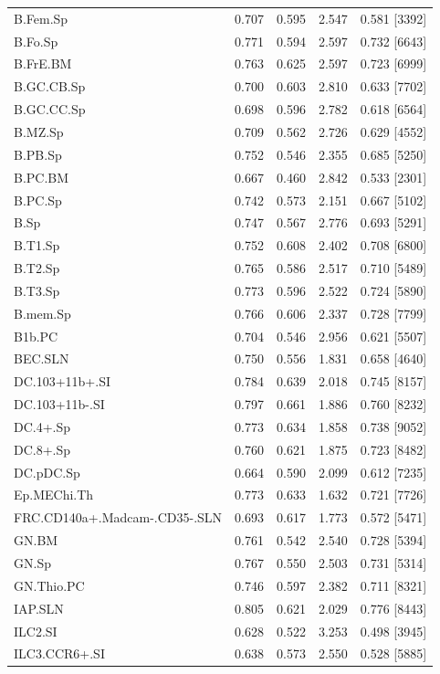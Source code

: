 \begin{longtable}[c]{lrrrr}
B.Fem.Sp & 0.707 & 0.595 & 2.547 & 0.581 [3392]  \\
B.Fo.Sp & 0.771 & 0.594 & 2.597 & 0.732 [6643]  \\
B.FrE.BM & 0.763 & 0.625 & 2.597 & 0.723 [6999]  \\
B.GC.CB.Sp & 0.700 & 0.603 & 2.810 & 0.633 [7702]  \\
B.GC.CC.Sp & 0.698 & 0.596 & 2.782 & 0.618 [6564]  \\
B.MZ.Sp & 0.709 & 0.562 & 2.726 & 0.629 [4552]  \\
B.PB.Sp & 0.752 & 0.546 & 2.355 & 0.685 [5250]  \\
B.PC.BM & 0.667 & 0.460 & 2.842 & 0.533 [2301]  \\
B.PC.Sp & 0.742 & 0.573 & 2.151 & 0.667 [5102]  \\
B.Sp & 0.747 & 0.567 & 2.776 & 0.693 [5291]  \\
B.T1.Sp & 0.752 & 0.608 & 2.402 & 0.708 [6800]  \\
B.T2.Sp & 0.765 & 0.586 & 2.517 & 0.710 [5489]  \\
B.T3.Sp & 0.773 & 0.596 & 2.522 & 0.724 [5890]  \\
B.mem.Sp & 0.766 & 0.606 & 2.337 & 0.728 [7799]  \\
B1b.PC & 0.704 & 0.546 & 2.956 & 0.621 [5507]  \\
BEC.SLN & 0.750 & 0.556 & 1.831 & 0.658 [4640]  \\
DC.103+11b+.SI & 0.784 & 0.639 & 2.018 & 0.745 [8157]  \\
DC.103+11b-.SI & 0.797 & 0.661 & 1.886 & 0.760 [8232]  \\
DC.4+.Sp & 0.773 & 0.634 & 1.858 & 0.738 [9052]  \\
DC.8+.Sp & 0.760 & 0.621 & 1.875 & 0.723 [8482]  \\
DC.pDC.Sp & 0.664 & 0.590 & 2.099 & 0.612 [7235]  \\
Ep.MEChi.Th & 0.773 & 0.633 & 1.632 & 0.721 [7726]  \\
FRC.CD140a+.Madcam-.CD35-.SLN & 0.693 & 0.617 & 1.773 & 0.572 [5471]  \\
GN.BM & 0.761 & 0.542 & 2.540 & 0.728 [5394]  \\
GN.Sp & 0.767 & 0.550 & 2.503 & 0.731 [5314]  \\
GN.Thio.PC & 0.746 & 0.597 & 2.382 & 0.711 [8321]  \\
IAP.SLN & 0.805 & 0.621 & 2.029 & 0.776 [8443]  \\
ILC2.SI & 0.628 & 0.522 & 3.253 & 0.498 [3945]  \\
ILC3.CCR6+.SI & 0.638 & 0.573 & 2.550 & 0.528 [5885]  \\

\end{longtable}
